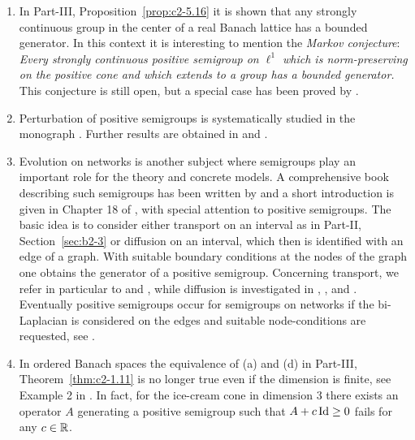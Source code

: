 \begin{enumerate}
\item
In Part-III, Proposition~\ref{prop:c2-5.16} it is shown that any strongly continuous group in the center of a real Banach lattice has a bounded generator. 
In this context it is interesting to mention the \emph{Markov conjecture}: \textit{Every strongly continuous positive semigroup on $\ell^{1}$ which is norm-preserving on the positive cone and which extends to a group has a bounded generator.} 
This conjecture is still open, but a special case has been proved by \textcite{zbmath07367032}.

\item

Perturbation of positive semigroups is systematically studied in the monograph 
\textcite{zbmath05030445}. Further results are obtained in  \textcite{zbmath07971662}  and \textcite{zbmath08137521}.
\item 
Evolution on networks is another subject where semigroups play an important role for the theory and concrete models. 
A comprehensive book describing such semigroups has been written by \textcite{zbmath06255542} and a short introduction is given in Chapter 18 of \textcite{zbmath06695787}, with special attention to positive semigroups. The basic idea is to consider either transport on an interval as in 
Part-II, Section~\ref{sec:b2-3} or diffusion on an interval, which then is identified with an edge of a graph.  With suitable boundary conditions at the nodes of the graph one obtains the generator of a positive semigroup. Concerning transport, we refer in particular to \textcite{zbmath05773159} and \textcite{zbmath05010468}, while diffusion is investigated in  \textcite{zbmath05180115}, \textcite{zbmath05244453}, \textcite{zbmath07952050} and \textcite{zbmath05167359}.
Eventually positive semigroups occur for semigroups on networks if the bi-Laplacian is considered on the edges and suitable node-conditions are requested, see \textcite{zbmath07189579}.

\item 
In ordered Banach spaces the equivalence of \upshape(a) and \upshape(d) in  Part-III, Theorem~\ref{thm:c2-1.11} is no longer true even if the dimension is finite, see Example 2 in \textcite{zbmath01146453}. 
In fact, for the ice-cream cone in dimension 3 there exists an operator $A$ generating a positive semigroup such that 
$A + c \Id \geq 0$ fails for any $c \in \mathbb{R}$.
\end{enumerate}
